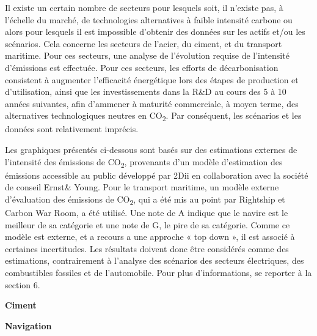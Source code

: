 \documentclass[10pt,table,a4]{article}\usepackage[]{graphicx}\usepackage[]{color}
\begin{document}
	\begin{multicols}{2}
		Il existe un certain nombre de secteurs pour lesquels soit, il n'existe pas, à l'échelle du marché, de technologies alternatives à faible intensité carbone ou alors pour lesquels il est impossible d'obtenir des données sur les actifs et/ou les scénarios. Cela concerne les secteurs de l'acier, du ciment, et du transport maritime. Pour ces secteurs, une analyse de l'évolution requise de l'intensité d'émissions est effectuée.
		Pour ces secteurs, les efforts de décarbonisation consistent à augmenter l’efficacité énergétique lors des étapes de production et d'utilisation, ainsi que les investissements dans la R\&D au cours des 5 à 10 années suivantes, afin d'ammener à maturité commerciale, à moyen terme, des alternatives technologiques neutres en CO\textsubscript{2}. Par conséquent, les scénarios et les données sont relativement imprécis.

		Les graphiques présentés ci-dessous sont basés sur des estimations externes de l'intensité des émissions de CO\textsubscript{2}, provenants d'un modèle d'estimation des émissions accessible au public développé par 2Dii en collaboration avec la société de conseil Ernst\& Young. Pour le transport maritime, un modèle externe d'évaluation des émissions de CO\textsubscript{2}, qui a été mis au point par Rightship et Carbon War Room, a été utilisé. Une note de A indique que le navire est le meilleur de sa catégorie et une note de G, le pire de sa catégorie. Comme ce modèle est externe, et a recours a une approche « top down », il est associé à certaines incertitudes. Les résultats doivent donc être considérés comme des estimations, contrairement à l'analyse des scénarios des secteurs électriques, des combustibles fossiles et de l'automobile. Pour plus d'informations, se reporter à la section 6.
		
	\end{multicols}
	\vspace{0.3cm}
	\begin{multicols}{2}
		\begin{center}
		\textbf{Ciment}
		\end{center}
    	\begin{center}
		\textbf{Navigation}
		\end{center}
	\end{multicols}
	
	\setlength\multicolsep{0pt}
	\vspace{0cm}
	
\end{document}
